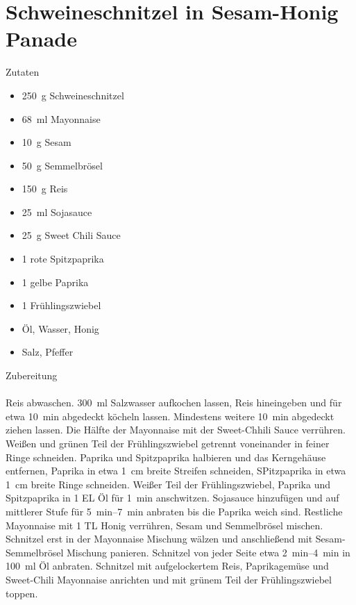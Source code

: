 \section*{Schweineschnitzel in Sesam-Honig Panade}
\ihead{}\ohead{}
\cfoot{}
{\Large Zutaten}
\begin{multicols}{2}
\begin{itemize}
    \item \SI{250}{g} Schweineschnitzel
    \item \SI{68}{ml} Mayonnaise
    \item \SI{10}{g} Sesam
    \item \SI{50}{g} Semmelbrösel
    \item \SI{150}{g} Reis
    \item \SI{25}{ml} Sojasauce
    \item \SI{25}{g} Sweet Chili Sauce
    \item \num{1} rote Spitzpaprika
    \item \num{1} gelbe Paprika
    \item \num{1} Frühlingszwiebel
    \item Öl, Wasser, Honig
    \item Salz, Pfeffer
\end{itemize}
\end{multicols}
\noindent
{\Large Zubereitung}\\
\\
Reis abwaschen.
\SI{300}{ml} Salzwasser aufkochen lassen, Reis hineingeben und für etwa \SI{10}{min} abgedeckt köcheln lassen.
Mindestens weitere \SI{10}{min} abgedeckt ziehen lassen.
Die Hälfte der Mayonnaise mit der Sweet-Chhili Sauce verrühren. 
Weißen und grünen Teil der Frühlingszwiebel getrennt voneinander in feiner Ringe schneiden.
Paprika und Spitzpaprika halbieren und das Kerngehäuse entfernen, Paprika in etwa \SI{1}{cm} breite Streifen schneiden, SPitzpaprika in etwa \SI{1}{cm} breite Ringe schneiden.
Weißer Teil der Frühlingszwiebel, Paprika und Spitzpaprika in \num{1} EL Öl für \SI{1}{min} anschwitzen. 
Sojasauce hinzufügen und auf mittlerer Stufe für \SIrange{5}{7}{min} anbraten bis die Paprika weich sind.
Restliche Mayonnaise mit \num{1} TL Honig verrühren, Sesam und Semmelbrösel mischen. 
Schnitzel erst in der Mayonnaise Mischung wälzen und anschließend mit Sesam-Semmelbrösel Mischung panieren.
Schnitzel von jeder Seite etwa \SIrange{2}{4}{min} in \SI{100}{ml} Öl anbraten. 
Schnitzel mit aufgelockertem Reis, Paprikagemüse und Sweet-Chili Mayonnaise anrichten und mit grünem Teil der Frühlingszwiebel toppen. 
